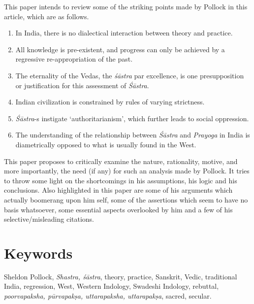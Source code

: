 This paper intends to review some of the striking points made by Pollock in this article, which are as follows.
\begin{enumerate}
\item In India, there is no dialectical interaction between theory and practice.

\item All knowledge is pre-existent, and progress can only be achieved by a regressive re-appropriation of the past.

\item The eternality of the Vedas, the {\it śāstra} par excellence, is one presupposition or justification for this assessment of {\it Śāstra}.

\item Indian civilization is constrained by rules of varying strictness.

\item {\it Śāstra}-s instigate `authoritarianism', which further leads to social oppression.

\item The understanding of the relationship between {\it Śāstra} and {\it Prayoga} in India is  diametrically opposed to what is usually found in the West. 
\end{enumerate}

This paper proposes to critically examine the nature, rationality, motive, and more importantly, the need (if any) for such an analysis made by Pollock. It tries to throw some light on the shortcomings in his assumptions, his logic and his conclusions. Also highlighted in this paper are some of his arguments which actually boomerang upon him self, some of the assertions which seem to have no basis whatsoever, some essential aspects overlooked by him and a few of his selective/misleading citations.

\vskip -12pt

\section*{Keywords}

Sheldon Pollock, \textsl{Shastra, śāstra}, theory, practice, Sanskrit, Vedic, traditional India, regression, West, Western Indology, Swadeshi Indology, rebuttal, \textsl{poorvapaksha, pūrvapakṣa, uttarapaksha, uttarapakṣa}, sacred, secular.

